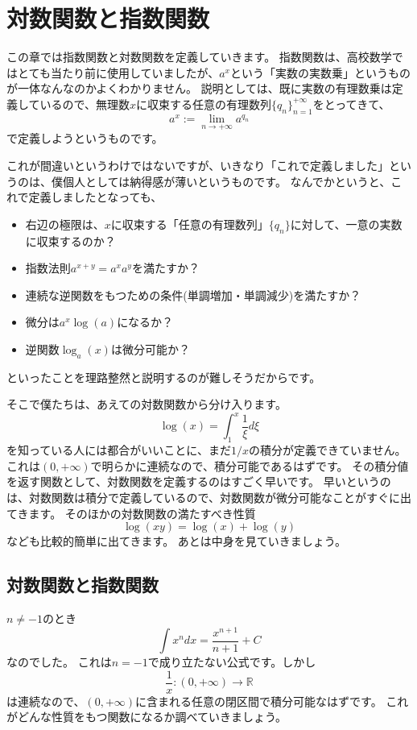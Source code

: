 \chapter{対数関数と指数関数}

この章では指数関数と対数関数を定義していきます。
指数関数は、高校数学ではとても当たり前に使用していましたが、$a^x$という「実数の実数乗」というものが一体なんなのかよくわかりません。
説明としては、既に実数の有理数乗は定義しているので、無理数$x$に収束する任意の有理数列$\{q_n\}_{n=1}^{+\infty}$をとってきて、
\[
  a^x:=\lim_{n\to+\infty}a^{q_n}
\]
で定義しようというものです。

これが間違いというわけではないですが、いきなり「これで定義しました」というのは、僕個人としては納得感が薄いというものです。
なんでかというと、これで定義しましたとなっても、
\begin{itemize}
  \item 右辺の極限は、$x$に収束する「任意の有理数列」$\{q_n\}$に対して、一意の実数に収束するのか？
  \item 指数法則$a^{x+y}=a^xa^y$を満たすか？
  \item 連続な逆関数をもつための条件(単調増加・単調減少)を満たすか？
  \item 微分は$a^x\log(a)$になるか？
  \item 逆関数$\log_a(x)$は微分可能か？
\end{itemize}
といったことを理路整然と説明するのが難しそうだからです。

そこで僕たちは、あえての対数関数から分け入ります。
\[
  \log(x)=\int_1^x \frac1\xi d\xi
\]
を知っている人には都合がいいことに、まだ$1/x$の積分が定義できていません。
これは$(0,+\infty)$で明らかに連続なので、積分可能であるはずです。
その積分値を返す関数として、対数関数を定義するのはすごく早いです。
早いというのは、対数関数は積分で定義しているので、対数関数が微分可能なことがすぐに出てきます。
そのほかの対数関数の満たすべき性質
\[
  \log(xy)=\log(x)+\log(y)
\]
なども比較的簡単に出てきます。
あとは中身を見ていきましょう。



\section{対数関数と指数関数}

$n\neq-1$のとき
\[
  \int x^ndx=\frac{x^{n+1}}{n+1}+C
\]
なのでした。
これは$n=-1$で成り立たない公式です。しかし
\[
  \frac1x:(0,+\infty)\to\mathbb{R}
\]
は連続なので、$(0,+\infty)$に含まれる任意の閉区間で積分可能なはずです。
これがどんな性質をもつ関数になるか調べていきましょう。

